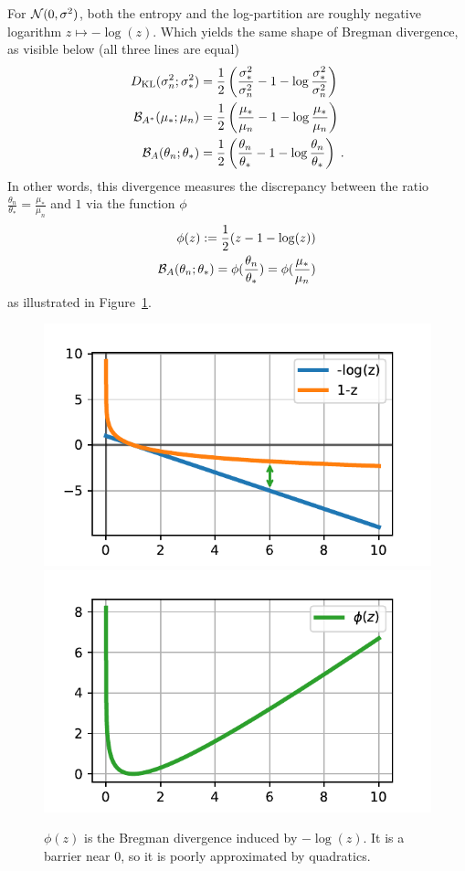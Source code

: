 \documentclass{article}
\newenvironment{example}{
	\begin{mdframed}[backgroundcolor=light-gray, roundcorner=5pt]
}{		
	\end{mdframed}
}
\newcommand{\logpart}{A}
\newcommand{\bregman}{\cB_\logpart}
\newcommand{\bregmanconj}{\cB_{\logpart^*}}
\newcommand{\natp}{\theta}
\begin{document}
\begin{example}
	For ${\mathcal N}(0,\sigma^2)$, both the entropy and the log-partition are roughly negative logarithm $z\mapsto - \log(z)$. Which yields the same shape of Bregman divergence, as visible below (all three lines are equal)
\begin{align}
	\KL( \sigma_n^2 ; \sigma_*^2) 
	&= \half \left ( \frac{\sigma_*^2}{ \sigma_n^2} - 1 - \log \frac{\sigma_*^2}{ \sigma_n^2} \right) \\
	\bregmanconj( \mu_*; \mu_n) 
	&= \half \left ( \frac{\mu_*}{ \mu_n} - 1 - \log  \frac{\mu_*}{ \mu_n} \right) \\
	\bregman( \natp_n; \natp_* ) 
	&=  \half \left ( \frac{ \natp_n}{\natp_*} - 1 - \log  \frac{ \natp_n}{\natp_*} \right) \; .
\end{align}
In other words, this divergence measures the discrepancy between the ratio $\frac{ \natp_n}{\natp_*} =  \frac{\mu_*}{ \mu_n}  $ and $1$ via the function $\phi$
\begin{align}
	\phi(z) := \half (z - 1 - \log(z)) \\
	\bregman( \natp_n; \natp_* )   = \phi(\frac{ \natp_n}{\natp_*}) =  \phi(\frac{\mu_*}{ \mu_n})
\end{align}
as illustrated in Figure~\ref{fig:phi}.
\end{example}

\begin{figure}[h]
	\centering
	\includegraphics[width=.4\textwidth]{figs/bregmandef.pdf}
	\includegraphics[width=.4\textwidth]{figs/phi.pdf}
	\caption{$\phi(z)$ is the Bregman divergence induced by $-\log(z)$. It is a barrier near $0$, so it is poorly approximated by quadratics.}
	\label{fig:phi}
\end{figure}
\end{document}

